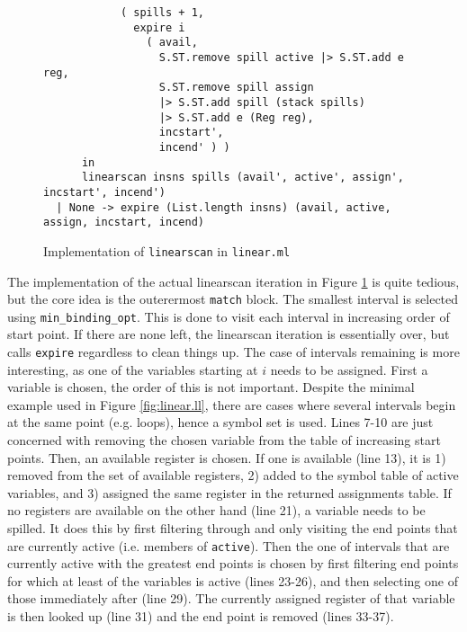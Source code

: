 \documentclass{article}
\begin{document}
\begin{figure}[H]
     \centering
     \begin{verbatim}
            ( spills + 1,
              expire i
                ( avail,
                  S.ST.remove spill active |> S.ST.add e reg,
                  S.ST.remove spill assign
                  |> S.ST.add spill (stack spills)
                  |> S.ST.add e (Reg reg),
                  incstart',
                  incend' ) )
      in
      linearscan insns spills (avail', active', assign', incstart', incend')
  | None -> expire (List.length insns) (avail, active, assign, incstart, incend)
     \end{verbatim}
     \caption{Implementation of \texttt{linearscan} in \texttt{linear.ml}}\label{fig:linearscan-ocaml}
\end{figure}
\noindent The implementation of the actual linearscan iteration in Figure \ref{fig:linearscan-ocaml} is quite tedious, but the core idea is the outerermost \texttt{match} block. The smallest interval is selected using \texttt{min\_binding\_opt}. This is done to visit each interval in increasing order of start point. If there are none left, the linearscan iteration is essentially over, but calls \texttt{expire} regardless to clean things up. The case of intervals remaining is more interesting, as one of the variables starting at \(i\) needs to be assigned. First a variable is chosen, the order of this is not important. Despite the minimal example used in Figure \ref{fig:linear.ll}, there are cases where several intervals begin at the same point (e.g. loops), hence a symbol set is used. Lines 7-10 are just concerned with removing the chosen variable from the table of increasing start points. Then, an available register is chosen. If one is available (line 13), it is 1) removed from the set of available registers, 2) added to the symbol table of active variables, and 3) assigned the same register in the returned assignments table. If no registers are available on the other hand (line 21), a variable needs to be spilled. It does this by first filtering through and only visiting the end points that are currently active (i.e. members of \texttt{active}). Then the one of intervals that are currently active with the greatest end points is chosen by first filtering end points for which at least of the variables is active (lines 23-26), and then selecting one of those immediately after (line 29). The currently assigned register of that variable is then looked up (line 31) and the end point is removed (lines 33-37). 
\end{document}
